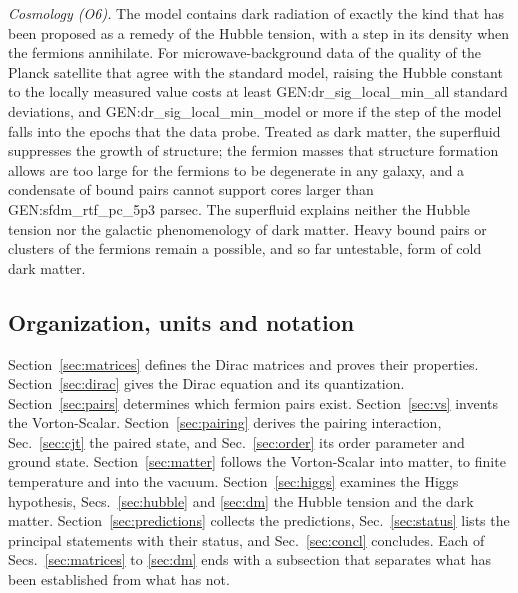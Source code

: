 \emph{Cosmology (O6).} The model contains dark radiation of exactly the kind that has been proposed as
a remedy of the Hubble tension, with a step in its density when the fermions annihilate. For
microwave-background data of the quality of the Planck satellite that agree with the standard model,
raising the Hubble constant to the locally measured value costs at least {{GEN:dr_sig_local_min_all}}
standard deviations, and {{GEN:dr_sig_local_min_model}} or more if the step of the model falls into the
epochs that the data probe. Treated as dark matter, the superfluid suppresses the growth of structure;
the fermion masses that structure formation allows are too large for the fermions to be degenerate in
any galaxy, and a condensate of bound pairs cannot support cores larger than {{GEN:sfdm_rtf_pc_5p3}}
parsec. The superfluid explains neither the Hubble tension nor the galactic phenomenology of dark
matter. Heavy bound pairs or clusters of the fermions remain a possible, and so far untestable, form of
cold dark matter.

\subsection{Organization, units and notation}
\label{sec:notation}

Section~\ref{sec:matrices} defines the Dirac matrices and proves their properties.
Section~\ref{sec:dirac} gives the Dirac equation and its quantization. Section~\ref{sec:pairs}
determines which fermion pairs exist. Section~\ref{sec:vs} invents the Vorton-Scalar.
Section~\ref{sec:pairing} derives the pairing interaction, Sec.~\ref{sec:cjt} the paired state, and
Sec.~\ref{sec:order} its order parameter and ground state. Section~\ref{sec:matter} follows the
Vorton-Scalar into matter, to finite temperature and into the vacuum. Section~\ref{sec:higgs} examines
the Higgs hypothesis, Secs.~\ref{sec:hubble} and \ref{sec:dm} the Hubble tension and the dark matter.
Section~\ref{sec:predictions} collects the predictions, Sec.~\ref{sec:status} lists the principal
statements with their status, and Sec.~\ref{sec:concl} concludes. Each of
Secs.~\ref{sec:matrices} to \ref{sec:dm} ends with a subsection that separates what has been
established from what has not.


